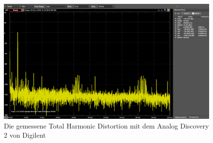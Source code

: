 \begin{figure} [H]
\begin{center}
 \includegraphics[width=\textwidth]{../graphics/THD_LineINOUT_Kopie.png}
 \caption{Die gemessene Total Harmonic Distortion mit dem Analog Discovery 2 von Digilent}
\label{fig:thdAD2}
\end{center}
\end{figure}

